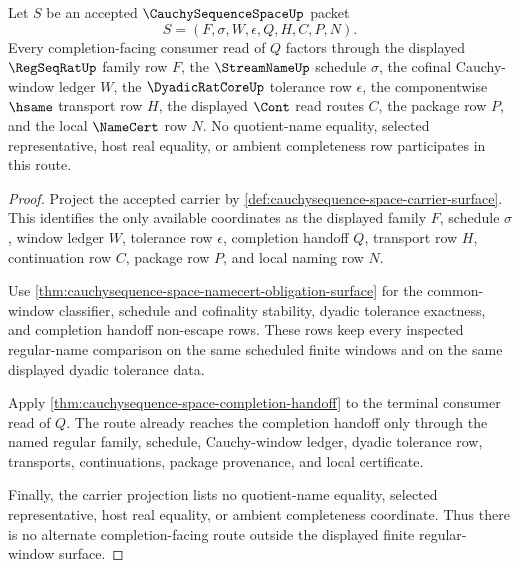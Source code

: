 \begin{theorem}
\label{thm:cauchysequence-space-regular-window-factorization}
Let $S$ be an accepted $\CauchySequenceSpaceUp$ packet
$$
S=(F,\sigma,W,\epsilon,Q,H,C,P,N).
$$
Every completion-facing consumer read of $Q$ factors through the displayed $\RegSeqRatUp$ family row $F$, the $\StreamNameUp$ schedule $\sigma$, the cofinal Cauchy-window ledger $W$, the $\DyadicRatCoreUp$ tolerance row $\epsilon$, the componentwise $\hsame$ transport row $H$, the displayed $\Cont$ read routes $C$, the package row $P$, and the local $\NameCert$ row $N$. No quotient-name equality, selected representative, host real equality, or ambient completeness row participates in this route.
\end{theorem}
\begin{proof}
Project the accepted carrier by \autoref{def:cauchysequence-space-carrier-surface}. This identifies the only available coordinates as the displayed family $F$, schedule $\sigma$, window ledger $W$, tolerance row $\epsilon$, completion handoff $Q$, transport row $H$, continuation row $C$, package row $P$, and local naming row $N$.

Use \autoref{thm:cauchysequence-space-namecert-obligation-surface} for the common-window classifier, schedule and cofinality stability, dyadic tolerance exactness, and completion handoff non-escape rows. These rows keep every inspected regular-name comparison on the same scheduled finite windows and on the same displayed dyadic tolerance data.

Apply \autoref{thm:cauchysequence-space-completion-handoff} to the terminal consumer read of $Q$. The route already reaches the completion handoff only through the named regular family, schedule, Cauchy-window ledger, dyadic tolerance row, transports, continuations, package provenance, and local certificate.

Finally, the carrier projection lists no quotient-name equality, selected representative, host real equality, or ambient completeness coordinate. Thus there is no alternate completion-facing route outside the displayed finite regular-window surface.
\end{proof}

